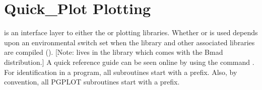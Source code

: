 \chapter{Quick_Plot Plotting}
\label{c:quick.plot}

\quickplot is an interface layer to either the \cite{b:pgplot} or
\cite{plplot} plotting libraries. Whether  or  is used depends upon
an environmental switch set when the \bmad library and other associated libraries are compiled
(). [Note: \quickplot lives in the  library which comes with the Bmad
distribution.] A quick reference guide can be seen online by using the command . For identification in a program, all \quickplot subroutines start with a 
prefix. Also, by convention, all PGPLOT subroutines start with a  prefix.


